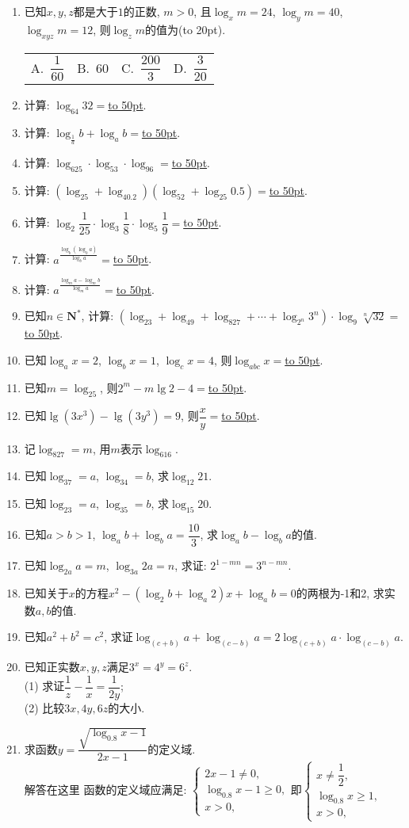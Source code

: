 \documentclass[10pt,a4paper]{article}
\newcommand{\blank}[1]{\underline{\hbox to #1pt{}}}
\newcommand{\bracket}[1]{(\hbox to #1pt{})}
\newcommand{\fourch}[4]{\par\begin{tabular}{p{.23\textwidth}p{.23\textwidth}p{.23\textwidth}p{.23\textwidth}}
A.~#1 &B.~#2& C.~#3& D.~#4
\end{tabular}}
\begin{document}
\begin{enumerate}[1.]
\item 已知$x,y,z$都是大于$1$的正数, $m>0$, 且$\log_xm=24$, $\log_ym=40$, $\log_{xyz}m=12$, 则$\log_zm$的值为\bracket{20}.
\fourch{$\dfrac 1{60}$}{$60$}{$\dfrac{200}3$}{$\dfrac 3{20}$}
\item 计算: $\log_{64}32=$\blank{50}.
\item 计算: $\log_{\frac 1a}b+\log_ab=$\blank{50}.
\item 计算: $\log_625\cdot \log_53\cdot \log_96=$\blank{50}.
\item 计算: $(\log_25+\log_40.2)(\log_52+\log_{25}0.5)=$\blank{50}.
\item 计算: $\log_2\dfrac 1{25}\cdot \log_3\dfrac 18\cdot \log_5\dfrac 19=$\blank{50}.
\item 计算: $a^{\frac{\log_b(\log_ba)}{\log_ba}}=$\blank{50}.
\item 计算: $a^{\frac{\log_ma-\log_mb}{\log_ma}}=$\blank{50}.
\item 已知$n\in \mathbf{N}^*$, 计算: $(\log_23+\log_49+\log_827+\cdots +\log_{2^n}3^n)\cdot \log_9\sqrt [n]{32}=$\blank{50}.
\item 已知$\log_ax=2$, $\log_bx=1$, $\log_cx=4$, 则$\log_{abc}x=$\blank{50}.
\item 已知$m=\log_25$, 则$2^m-m\lg 2-4=$\blank{50}.
\item 已知$\lg (3x^3)-\lg (3y^3)=9$, 则$\dfrac xy=$\blank{50}.
\item 记$\log_827=m$, 用$m$表示$\log_616$.
\item 已知$\log_37=a$, $\log_34=b$, 求$\log_{12}21$.
\item 已知$\log_23=a$, $\log_35=b$, 求$\log_{15}20$.
\item 已知$a>b>1$, $\log_ab+\log_ba=\dfrac{10}3$, 求$\log_ab-\log_ba$的值.
\item 已知$\log_{2a}a=m$, $\log_{3a}2a=n$, 求证: $2^{1-mn}=3^{n-mn}$.
\item 已知关于$x$的方程$x^2-(\log_2b+\log_a2)x+\log_ab=0$的两根为-1和2, 求实数$a,b$的值.
\item 已知$a^2+b^2=c^2$, 求证$\log_{(c+b)}a+\log_{(c-b)}a=2\log_{(c+b)}a\cdot \log_{(c-b)}a$.
\item 已知正实数$x,y,z$满足$3^x=4^y=6^z$.\\
(1) 求证$\dfrac 1z-\dfrac 1x=\dfrac 1{2y}$;\\
(2) 比较$3x,4y,6z$的大小.
\item 求函数$y=\dfrac{\sqrt {\log_{0.8}x-1}}{2x-1}$的定义域.\\
解答在这里  函数的定义域应满足: $\begin{cases} 2x-1\ne 0, \\ \log_{0.8}x-1\ge 0, \\ x>0, \end{cases}$即$\begin{cases} x\ne \dfrac 12, \\ \log_{0.8}x\ge 1, \\ x>0, \end{cases}$

\end{enumerate}
\end{document}
